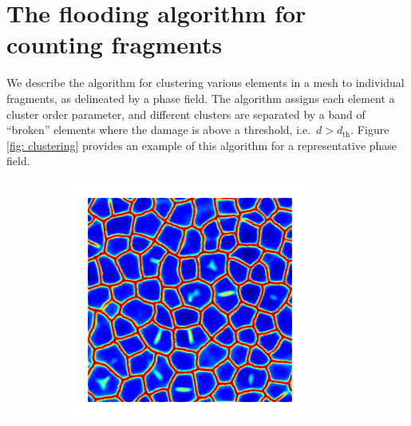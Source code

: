 \chapter{The flooding algorithm for counting fragments}
\label{appendix: flooding}

We describe the algorithm for clustering various elements in a mesh to individual fragments, as delineated by a phase field.
The algorithm assigns each element a cluster order parameter, and different clusters are separated by a band of ``broken'' elements where the damage is above a threshold, i.e.\ $d > d_{\text{th}}$. Figure \ref{fig: clustering} provides an example of this algorithm for a representative phase field.

\begin{figure}[htb!]
  \centering
  \begin{subfigure}[b]{0.375\textwidth}
    \includegraphics[width=\textwidth]{Appendices/figures/damage.png}
    \caption{}
  \end{subfigure}
  \begin{subfigure}[b]{0.36\textwidth}

\end{subfigure}
\end{figure}
